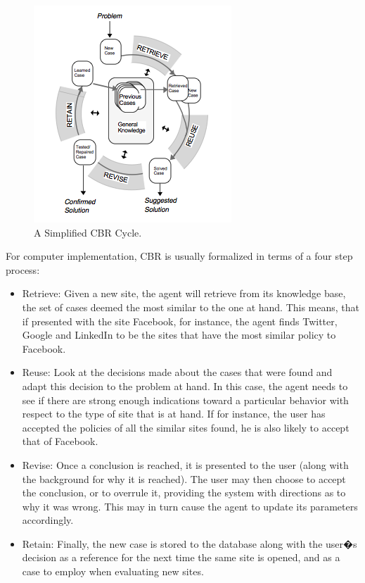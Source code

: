 \begin{figure}[htbp]
\begin{center}
\includegraphics[width = .6\textwidth]{PrelimStudy/cbrCycle}
\caption{A Simplified CBR Cycle.}
\label{cbrCycle}
\end{center}
\end{figure}


For computer implementation, CBR is usually formalized in terms of a four step process:

\begin{itemize}
\item Retrieve: 
Given a new site, the agent will retrieve from its knowledge base, the set of cases deemed the most similar to the one at hand. This means, that if presented with the site Facebook, for instance, the agent finds Twitter, Google and LinkedIn to be the sites that have the most similar policy to Facebook.
\item Reuse: 
Look at the decisions made about the cases that were found and adapt this decision to the problem at hand. In this case, the agent needs to see if there are strong enough indications toward a particular behavior with respect to the type of site that is at hand. If for instance, the user has accepted the policies of all the similar sites found, he is also likely to accept that of Facebook.
\item Revise: 
Once a conclusion is reached, it is presented to the user (along with the background for why it is reached). The user may then choose to accept the conclusion, or to overrule it, providing the system with directions as to why it was wrong. This may in turn cause the agent to update its parameters accordingly. 
\item Retain: Finally, the new case is stored to the database along with the user�s decision as a reference for the next time the same site is opened, and as a case to employ when evaluating new sites.
\end{itemize}

